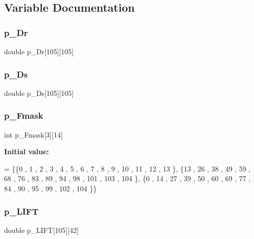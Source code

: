 \subsection{Variable Documentation}
\mbox{\label{a00542_a460d600f0ff3f977d6bb84e05389b361}} 
\subsubsection{\texorpdfstring{p\+\_\+\+Dr}{p\_Dr}}
{\footnotesize\ttfamily double p\+\_\+\+Dr\mbox{[}105\mbox{]}\mbox{[}105\mbox{]}}

\mbox{\label{a00542_a8603272c45dcf26777922b1b700ddc42}} 
\subsubsection{\texorpdfstring{p\+\_\+\+Ds}{p\_Ds}}
{\footnotesize\ttfamily double p\+\_\+\+Ds\mbox{[}105\mbox{]}\mbox{[}105\mbox{]}}

\mbox{\label{a00542_a9a558684d4d02ac1accd4a39add4a48f}} 
\subsubsection{\texorpdfstring{p\+\_\+\+Fmask}{p\_Fmask}}
{\footnotesize\ttfamily int p\+\_\+\+Fmask\mbox{[}3\mbox{]}\mbox{[}14\mbox{]}}

{\bfseries Initial value\+:}
\begin{DoxyCode}
= \{\{0 , 1 , 2 , 3 , 4 , 5 , 6 , 7 , 8 , 9 , 10 , 11 , 12 , 13 \},
\{13 , 26 , 38 , 49 , 59 , 68 , 76 , 83 , 89 , 94 , 98 , 101 , 103 , 104 \},
\{0 , 14 , 27 , 39 , 50 , 60 , 69 , 77 , 84 , 90 , 95 , 99 , 102 , 104 \}\}
\end{DoxyCode}
\mbox{\label{a00542_a8831ba80c170b69db851fd72578da2af}} 
\subsubsection{\texorpdfstring{p\+\_\+\+L\+I\+FT}{p\_LIFT}}
{\footnotesize\ttfamily double p\+\_\+\+L\+I\+FT\mbox{[}105\mbox{]}\mbox{[}42\mbox{]}}

